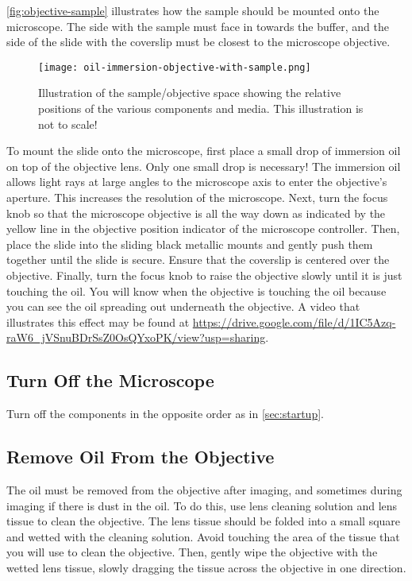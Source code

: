 \documentclass[10pt,a4paper,oneside]{book}
\begin{document}
\autoref{fig:objective-sample} illustrates how the sample should be mounted onto the microscope. The side with the sample must face in towards the buffer, and the side of the slide with the coverslip must be closest to the microscope objective.

\begin{figure}[ht]
    \centering
    \texttt{[image: oil-immersion-objective-with-sample.png]}
    \caption{Illustration of the sample/objective space showing the relative positions of the various components and media. This illustration is not to scale!}
    \label{fig:objective-sample}
\end{figure}

To mount the slide onto the microscope, first place a small drop of immersion oil on top of the objective lens. Only one small drop is necessary! The immersion oil allows light rays at large angles to the microscope axis to enter the objective's aperture. This increases the resolution of the microscope. Next, turn the focus knob so that the microscope objective is all the way down as indicated by the yellow line in the objective position indicator of the microscope controller. Then, place the slide into the sliding black metallic mounts and gently push them together until the slide is secure. Ensure that the coverslip is centered over the objective. Finally, turn the focus knob to raise the objective slowly until it is just touching the oil. You will know when the objective is touching the oil because you can see the oil spreading out underneath the objective. A video that illustrates this effect may be found at \url{https://drive.google.com/file/d/1IC5Azq-raW6_jVSnuBDrSsZ0OsQYxoPK/view?usp=sharing}.

\subsection{Turn Off the Microscope}

Turn off the components in the opposite order as in \autoref{sec:startup}.

\subsection{Remove Oil From the Objective}

The oil must be removed from the objective after imaging, and sometimes during imaging if there is dust in the oil. To do this, use lens cleaning solution and lens tissue to clean the objective. The lens tissue should be folded into a small square and wetted with the cleaning solution. Avoid touching the area of the tissue that you will use to clean the objective. Then, gently wipe the objective with the wetted lens tissue, slowly dragging the tissue across the objective in one direction.
\end{document}
